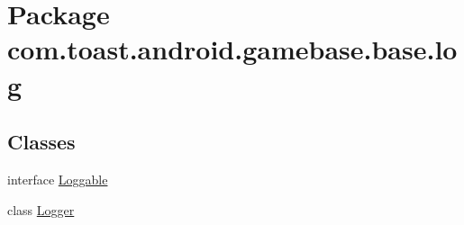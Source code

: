 \hypertarget{namespacecom_1_1toast_1_1android_1_1gamebase_1_1base_1_1log}{}\section{Package com.\+toast.\+android.\+gamebase.\+base.\+log}
\label{namespacecom_1_1toast_1_1android_1_1gamebase_1_1base_1_1log}
\subsection*{Classes}
\begin{DoxyCompactItemize}
\item 
interface \hyperlink{interfacecom_1_1toast_1_1android_1_1gamebase_1_1base_1_1log_1_1_loggable}{Loggable}
\item 
class \hyperlink{classcom_1_1toast_1_1android_1_1gamebase_1_1base_1_1log_1_1_logger}{Logger}
\end{DoxyCompactItemize}
